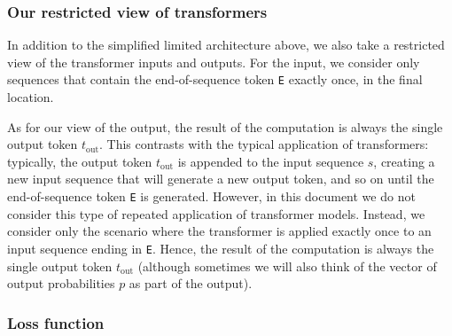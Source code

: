 \documentclass{article}
\begin{document}
\subsubsection*{Our restricted view of transformers}

In addition to the simplified limited architecture above, we also take
a restricted view of the transformer inputs and outputs. For the
input, we consider only sequences that contain the end-of-sequence
token \texttt{E} exactly once, in the final location.

As for our view of the output, the result of the computation is always
the single output token $t_\text{out}$. This contrasts with the
typical application of transformers: typically, the output token
$t_\text{out}$ is appended to the input sequence $s$, creating a new
input sequence that will generate a new output token, and so on until
the end-of-sequence token \texttt{E} is generated. However, in this
document we do not consider this type of repeated application of
transformer models. Instead, we consider only the scenario where the
transformer is applied exactly once to an input sequence ending in
\texttt{E}. Hence, the result of the computation is always the single
output token $t_\text{out}$ (although sometimes we will also think of
the vector of output probabilities $p$ as part of the output).

\subsubsection*{Loss function}
\end{document}
